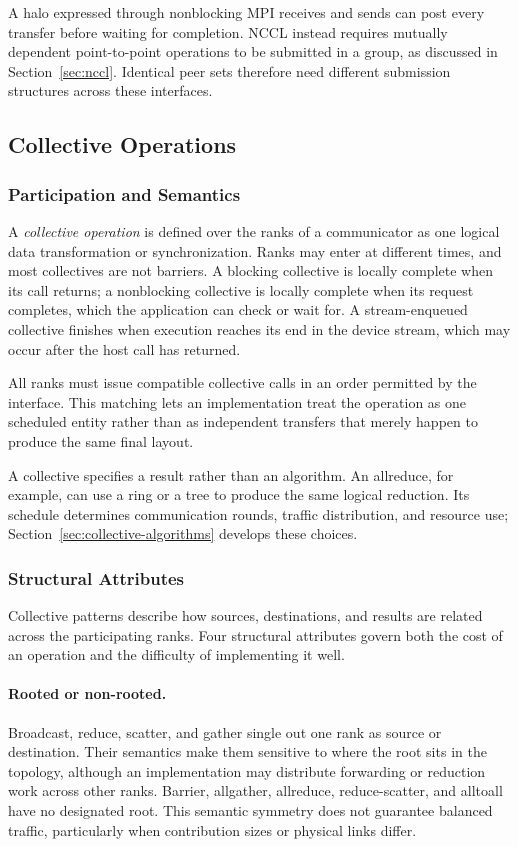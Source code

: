 A halo expressed through nonblocking MPI receives and sends can post every transfer before waiting for completion. NCCL instead requires mutually dependent point-to-point operations to be submitted in a group, as discussed in Section~\ref{sec:nccl}. Identical peer sets therefore need different submission structures across these interfaces.

\subsection{Collective Operations}\label{sec:collectives}

\subsubsection{Participation and Semantics}

A \emph{collective operation} is defined over the ranks of a communicator as one logical data transformation or synchronization. Ranks may enter at different times, and most collectives are not barriers. A blocking collective is locally complete when its call returns; a nonblocking collective is locally complete when its request completes, which the application can check or wait for. A stream-enqueued collective finishes when execution reaches its end in the device stream, which may occur after the host call has returned.

All ranks must issue compatible collective calls in an order permitted by the interface. This matching lets an implementation treat the operation as one scheduled entity rather than as independent transfers that merely happen to produce the same final layout.

A collective specifies a result rather than an algorithm. An allreduce, for example, can use a ring or a tree to produce the same logical reduction. Its schedule determines communication rounds, traffic distribution, and resource use; Section~\ref{sec:collective-algorithms} develops these choices.

\subsubsection{Structural Attributes}

Collective patterns describe how sources, destinations, and results are related across the participating ranks. Four structural attributes govern both the cost of an operation and the difficulty of implementing it well.

\paragraph{Rooted or non-rooted.} Broadcast, reduce, scatter, and gather single out one rank as source or destination. Their semantics make them sensitive to where the root sits in the topology, although an implementation may distribute forwarding or reduction work across other ranks. Barrier, allgather, allreduce, reduce-scatter, and alltoall have no designated root. This semantic symmetry does not guarantee balanced traffic, particularly when contribution sizes or physical links differ.

